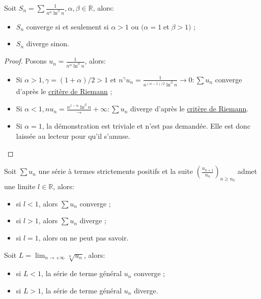 \documentclass[12pt]{article}
\newenvironment{definition}[2][Définition]{\begin{trivlist}
\item[\hskip \labelsep {\bfseries #1}\hskip \labelsep {\bfseries #2.}]}{\end{trivlist}}
\begin{document}
\bigskip
\begin{definition}{: Séries de Bertrand}
Soit $S_n=\sum\frac{1}{n^\alpha\ln^\beta{n}}, \alpha,\beta \in \mathbb{R}$, alors:
\begin{itemize}
    \item $S_n$ converge si et seulement si $\alpha > 1$ ou $(\alpha = 1 \;$et$\; \beta > 1)$ ;
    \item $S_n$ diverge sinon.
\end{itemize}
\end{definition}
\begin{proof}
 Posons $u_n=\frac{1}{n^\alpha\ln^\beta{n}}$, alors:
 \begin{itemize}
     \item Si $\alpha > 1, \gamma = (1 + \alpha)/2 > 1$ et $n^\gamma u_n = \frac{1}{n^{(\alpha-1)/2}\ln^\beta{n}} \longrightarrow 0 : \sum u_n$ converge d'après le \hyperlink{riemannCritere}{critère de Riemann} ;
     \item Si $\alpha < 1, nu_n = \frac{n^{1-\alpha}{\ln^\beta{n}}}\longrightarrow+\infty:\sum u_n$ diverge d'après le \hyperlink{riemannCritere}{critère de Riemann}.
     \item Si $\alpha = 1$, la démonstration est triviale et n'est pas demandée. Elle est donc laissée au lecteur pour qu'il s'amuse. 
 \end{itemize}
\end{proof}
\bigskip
\begin{definition}{: Test de d'Alembert}
Soit $\sum u_n$ une série à termes strictements positifs et la suite $(\frac{u_{n+1}}{u_n})_{n\ge n_0}$ admet une limite $l\in\mathbb{R}$, alors:
\begin{itemize}
    \item si $l < 1$, alors $\sum u_n$ converge ;
    \item si $l > 1$, alors $\sum u_n$ diverge ;
    \item si $l = 1$, alors on ne peut pas savoir.
\end{itemize}
\end{definition}
\bigskip
\begin{definition}{: Test de Cauchy}
Soit $L=\lim_{n\rightarrow+\infty}\sqrt[n]{u_n}$, alors: 
\begin{itemize}
    \item si $L < 1$, la série de terme général $u_n$ converge ;
    \item si $L > 1$, la série de terme général $u_n$ diverge.
\end{itemize}
\end{definition}
\end{document}
